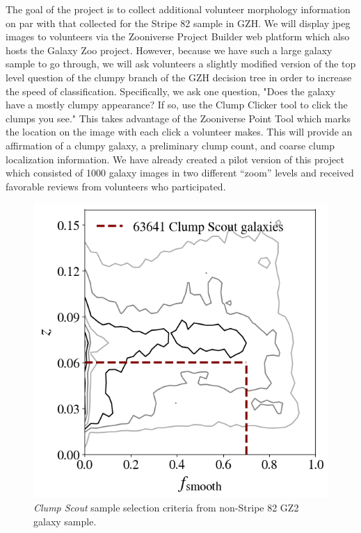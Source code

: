The goal of the project is to collect additional volunteer morphology information on par with that collected for the Stripe 82 sample in GZH. We will display jpeg images to volunteers via the Zooniverse Project Builder web platform which also hosts the Galaxy Zoo project.  However, because we have such a large galaxy sample to go through, we will ask volunteers a slightly modified version of the top level question of the clumpy branch of the GZH decision tree in order to increase the speed of classification. Specifically, we ask one question, "Does the galaxy have a mostly clumpy appearance? If so, use the Clump Clicker tool to click the clumps you see." This takes advantage of the Zooniverse Point Tool which marks the location on the image with each click a volunteer makes. This will provide an affirmation of a clumpy galaxy, a preliminary clump count, and coarse clump localization information. We have already created a pilot version of this project which consisted of 1000 galaxy images in two different ``zoom'' levels and received favorable reviews from volunteers who participated. 

\begin{figure}
\centering
\includegraphics[width=5in]{Figures/clump_scout_sample_in_z-fsmooth.png}
\caption[\textit{Clump Scout} sample selection criteria from non-Stripe 82 GZ2 galaxy sample.]{\textit{Clump Scout} sample selection criteria from non-Stripe 82 GZ2 galaxy sample.}
\label{fig: clump scout sample}
\end{figure}



